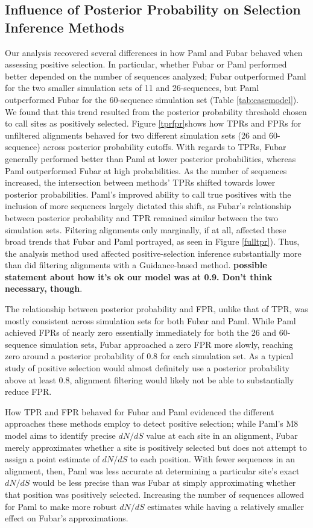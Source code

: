 \documentclass[10pt]{article}
\begin{document}
\subsection*{Influence of Posterior Probability on Selection Inference Methods}

Our analysis recovered several differences in how Paml and Fubar behaved when assessing positive selection. In particular, whether Fubar or Paml performed better depended on the number of sequences analyzed; Fubar outperformed Paml for the two smaller simulation sets of 11 and 26-sequences, but Paml outperformed Fubar for the 60-sequence simulation set (Table \ref{tab:casemodel}). We found that this trend resulted from the posterior probability threshold chosen to call sites as positively selected. Figure \ref{tprfpr}shows how TPRs and FPRs for unfiltered alignments behaved for two different simulation sets (26 and 60-sequence) across posterior probability cutoffs. With regards to TPRs,
Fubar generally performed better than Paml at lower posterior probabilities, whereas Paml outperformed Fubar at high probabilities. As the number of sequences increased, the intersection between methods' TPRs shifted towards lower posterior probabilities. Paml's improved ability to call true positives with the inclusion of more sequences largely dictated this shift, as Fubar's relationship between posterior probability and TPR remained similar between the two simulation sets.  Filtering alignments only marginally, if at all, affected these broad trends that Fubar and Paml portrayed, as seen in Figure \ref{fulltpr}). Thus, the analysis method used affected positive-selection inference substantially more than did filtering  alignments with a Guidance-based method. \textbf{possible statement about how it's ok our model was at 0.9. Don't think necessary, though}.

The relationship between posterior probability and FPR, unlike that of TPR, was mostly consistent across simulation sets for both Fubar and Paml. While Paml achieved FPRs of nearly zero essentially immediately for both the 26 and 60-sequence simulation sets, Fubar approached a zero FPR more slowly, reaching zero around a posterior probability of 0.8 for each simulation set. As a typical study of positive selection would almost definitely use a posterior probability above at least 0.8, alignment filtering would likely not be able to substantially reduce FPR.

How TPR and FPR behaved for Fubar and Paml evidenced the different approaches these methods employ to detect positive selection; while Paml's M8 model aims to identify precise $dN/dS$ value at each site in an alignment, Fubar merely approximates whether a site is positively selected but does not attempt to assign a point estimate of $dN/dS$ to each position. With fewer sequences in an alignment, then, Paml was less accurate at determining  a particular site's exact $dN/dS$ would be less precise than was Fubar at simply approximating whether that position was positively selected. Increasing the number of sequences allowed for Paml to make more robust $dN/dS$ estimates while having a relatively smaller effect on Fubar's approximations.
\end{document}
